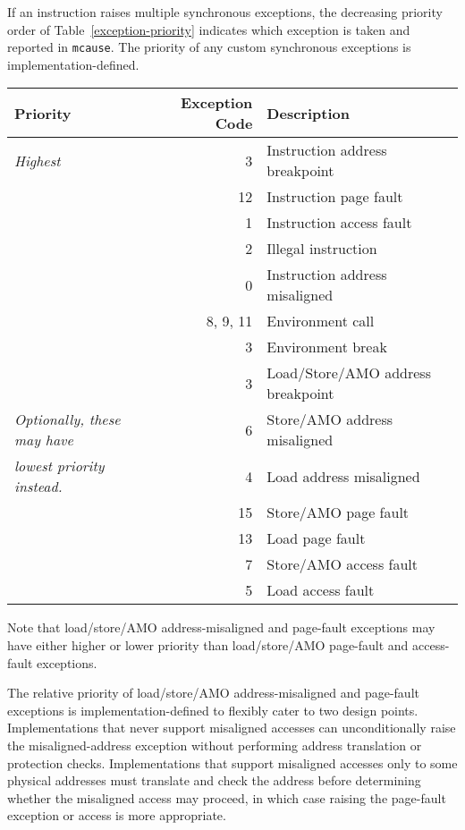 If an instruction raises multiple synchronous exceptions, the
decreasing priority order of Table~\ref{exception-priority}
indicates which exception is taken and reported in {\tt mcause}.
The priority of any custom synchronous exceptions is implementation-defined.

\begin{table*}[htbp]
\begin{center}
\begin{tabular}{|l|r|l|}

  \hline
  Priority      & Exception Code & Description \\
  \hline
  {\em Highest} &          3 & Instruction address breakpoint \\ \hline
                &         12 & Instruction page fault \\ \hline
                &          1 & Instruction access fault \\ \hline
                &          2 & Illegal instruction \\
                &          0 & Instruction address misaligned \\
                &   8, 9, 11 & Environment call \\
                &          3 & Environment break \\
                &          3 & Load/Store/AMO address breakpoint \\ \hline
  {\em Optionally, these may have}
                &          6 & Store/AMO address misaligned \\
  {\em lowest priority instead.}
                &          4 & Load address misaligned \\ \hline
                &         15 & Store/AMO page fault \\
                &         13 & Load page fault \\ \hline
                &          7 & Store/AMO access fault \\
                &          5 & Load access fault \\
  \hline

\end{tabular}
\end{center}
\caption{Synchronous exception priority in decreasing priority order.}
\label{exception-priority}
\end{table*}

Note that load/store/AMO address-misaligned and page-fault exceptions may have
either higher or lower priority than load/store/AMO page-fault and
access-fault exceptions.
\begin{commentary}
The relative priority of load/store/AMO address-misaligned and page-fault
exceptions is implementation-defined to flexibly cater to two design points.
Implementations that never support misaligned accesses can unconditionally
raise the misaligned-address exception without performing address translation
or protection checks.
Implementations that support misaligned accesses only to some physical
addresses must translate and check the address before determining whether the
misaligned access may proceed, in which case raising the page-fault exception
or access is more appropriate.
\end{commentary}


